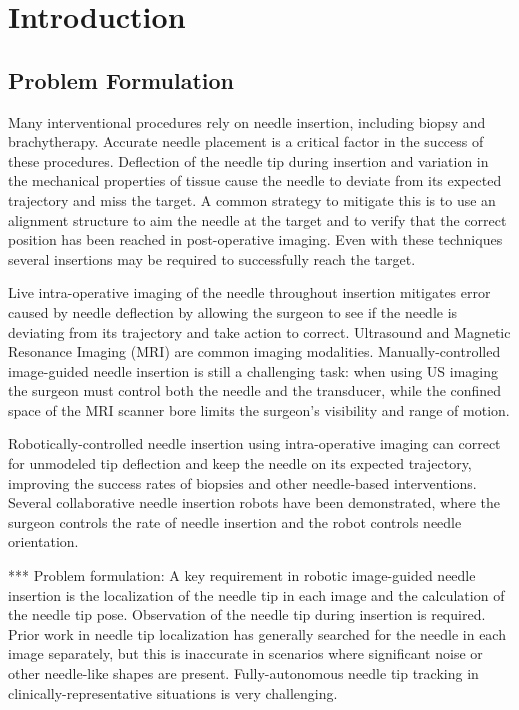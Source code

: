\chapter{Introduction}
\label{intro} %


\section{Problem Formulation}
Many interventional procedures rely on needle insertion, including biopsy and brachytherapy. Accurate needle placement is a critical factor in the success of these procedures. Deflection of the needle tip during insertion and variation in the mechanical properties of tissue cause the needle to deviate from its expected trajectory and miss the target. A common strategy to mitigate this is to use an alignment structure to aim the needle at the target and to verify that the correct position has been reached in post-operative imaging. Even with these techniques several insertions may be required to successfully reach the target.

Live intra-operative imaging of the needle throughout insertion mitigates error caused by needle deflection by allowing the surgeon to see if the needle is deviating from its trajectory and take action to correct. Ultrasound and Magnetic Resonance Imaging (MRI) are common imaging modalities. Manually-controlled image-guided needle insertion is still a challenging task: when using US imaging the surgeon must control both the needle and the transducer, while the confined space of the MRI scanner bore limits the surgeon's visibility and range of motion.

Robotically-controlled needle insertion using intra-operative imaging can correct for unmodeled tip deflection and keep the needle on its expected trajectory, improving the success rates of biopsies and other needle-based interventions. Several collaborative needle insertion robots have been demonstrated, where the surgeon controls the rate of needle insertion and the robot controls needle orientation.


*** Problem formulation: A key requirement in robotic image-guided needle insertion is the localization of the needle tip in each image and the calculation of the needle tip pose. Observation of the needle tip during insertion is required. Prior work in needle tip localization has generally searched for the needle in each image separately, but this is inaccurate in scenarios where significant noise or other needle-like shapes are present. Fully-autonomous needle tip tracking in clinically-representative situations is very challenging.


